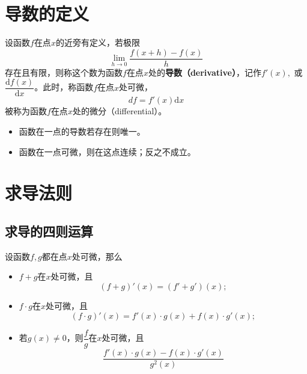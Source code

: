 \section{导数的定义} %
\begin{frame}

\begin{Def}
设函数$f$在点$x$的近旁有定义，若极限
\[\lim\limits_{h\to 0} \dfrac{f(x+h)-f(x)}{h}\]
存在且有限，则称这个数为函数$f$在点$x$处的{\bfseries 导数（derivative）}，记作$f'(x),$ 或$\dfrac{\mathrm{d}f(x)}{\mathrm{d}x}$。此时，称函数$f$在点$x$处可微，
\[df = f'(x)\mathrm{d}x\]
被称为函数$f$在点$x$处的微分（differential）。
\end{Def}

\pause

\begin{remark}
\begin{itemize}
\item 函数在一点的导数若存在则唯一。
\item 函数在一点可微，则在这点连续；反之不成立。
\end{itemize}
\end{remark}

\end{frame}


\section{求导法则}


\subsection{求导的四则运算}


\begin{frame}

设函数$f,g$都在点$x$处可微，那么
\begin{itemize}
\item<2-> $f+g$在$x$处可微，且
\[(f+g)'(x) = (f'+g')(x);\]
\item<3-> $f\cdot g$在$x$处可微，且
\[(f\cdot g)'(x) = f'(x)\cdot g(x) + f(x)\cdot g'(x);\]
\item<4-> 若$g(x)\neq0$，则$\dfrac{f}{g}$在$x$处可微，且
\[\dfrac{f'(x)\cdot g(x) - f(x)\cdot g'(x)}{g^2(x)}\]
\end{itemize}

\end{frame}

